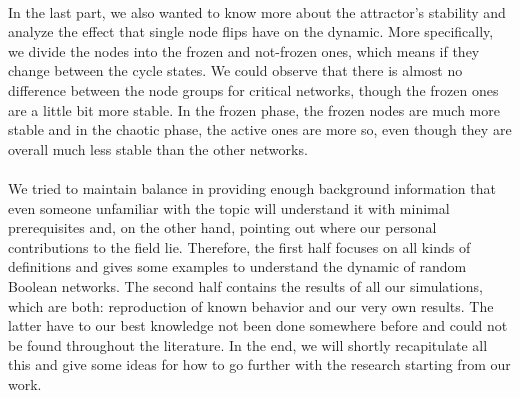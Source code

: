\paragraph*{}
In the last part, we also wanted to know more about the attractor's stability and analyze the effect that single node flips have on the dynamic. More specifically, we divide the nodes into the frozen and not-frozen ones, which means if they change between the cycle states. We could observe that there is almost no difference between the node groups for critical networks, though the frozen ones are a little bit more stable. In the frozen phase, the frozen nodes are much more stable and in the chaotic phase, the active ones are more so, even though they are overall much less stable than the other networks.

\paragraph*{}
We tried to maintain balance in providing enough background information that even someone unfamiliar with the topic will understand it with minimal prerequisites and, on the other hand, pointing out where our personal contributions to the field lie. Therefore, the first half focuses on all kinds of definitions and gives some examples to understand the dynamic of random Boolean networks. The second half contains the results of all our simulations, which are both: reproduction of known behavior and our very own results. The latter have to our best knowledge not been done somewhere before and could not be found throughout the literature. In the end, we will shortly recapitulate all this and give some ideas for how to go further with the research starting from our work.

\newpage
\thispagestyle{empty}